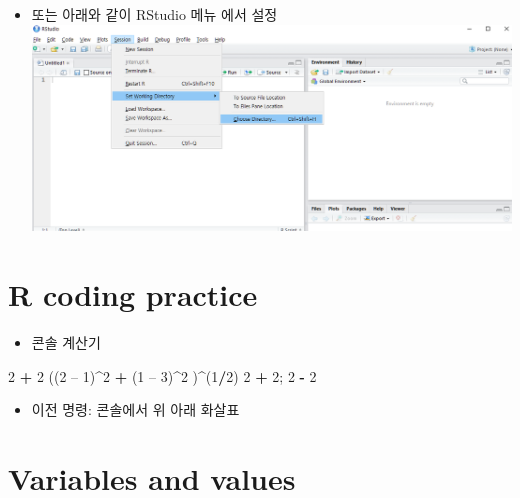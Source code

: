 \documentclass[]{book}
\newenvironment{Shaded}{\begin{snugshade}}{\end{snugshade}}
\newcommand{\DecValTok}[1]{\textcolor[rgb]{0.00,0.00,0.81}{#1}}
\newcommand{\StringTok}[1]{\textcolor[rgb]{0.31,0.60,0.02}{#1}}
\newcommand{\OperatorTok}[1]{\textcolor[rgb]{0.81,0.36,0.00}{\textbf{#1}}}
\newcommand{\NormalTok}[1]{#1}
\providecommand{\tightlist}{%
  \setlength{\itemsep}{0pt}\setlength{\parskip}{0pt}}
\begin{document}
\begin{itemize}
\tightlist
\item
  또는 아래와 같이 RStudio 메뉴 에서 설정
  \includegraphics{images/01-12.PNG}
\end{itemize}

\hypertarget{r-coding-practice}{%
\section{R coding practice}\label{r-coding-practice}}

\begin{itemize}
\tightlist
\item
  콘솔 계산기
\end{itemize}

\begin{Shaded}
\begin{Highlighting}[]
\DecValTok{2} \OperatorTok{+}\StringTok{ }\DecValTok{2}
\NormalTok{((}\DecValTok{2}\NormalTok{ – }\DecValTok{1}\NormalTok{)}\OperatorTok{^}\DecValTok{2} \OperatorTok{+}\StringTok{ }\NormalTok{(}\DecValTok{1}\NormalTok{ – }\DecValTok{3}\NormalTok{)}\OperatorTok{^}\DecValTok{2}\NormalTok{ )}\OperatorTok{^}\NormalTok{(}\DecValTok{1}\OperatorTok{/}\DecValTok{2}\NormalTok{)}
\DecValTok{2} \OperatorTok{+}\StringTok{ }\DecValTok{2}\NormalTok{; }\DecValTok{2} \OperatorTok{-}\StringTok{ }\DecValTok{2}
\end{Highlighting}
\end{Shaded}

\begin{itemize}
\tightlist
\item
  이전 명령: 콘솔에서 위 아래 화살표
\end{itemize}

\hypertarget{variables-and-values}{%
\section{Variables and values}\label{variables-and-values}}
\end{document}
